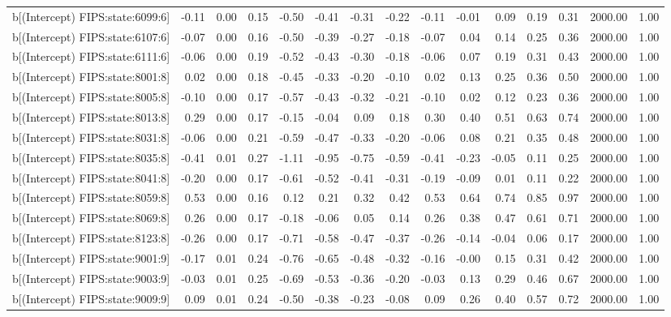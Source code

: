 \begin{table}[ht]
\begin{tabular}{rrrrrrrrrrrrrrr}
  b[(Intercept) FIPS:state:6099:6] & -0.11 & 0.00 & 0.15 & -0.50 & -0.41 & -0.31 & -0.22 & -0.11 & -0.01 & 0.09 & 0.19 & 0.31 & 2000.00 & 1.00 \\ 
  b[(Intercept) FIPS:state:6107:6] & -0.07 & 0.00 & 0.16 & -0.50 & -0.39 & -0.27 & -0.18 & -0.07 & 0.04 & 0.14 & 0.25 & 0.36 & 2000.00 & 1.00 \\ 
  b[(Intercept) FIPS:state:6111:6] & -0.06 & 0.00 & 0.19 & -0.52 & -0.43 & -0.30 & -0.18 & -0.06 & 0.07 & 0.19 & 0.31 & 0.43 & 2000.00 & 1.00 \\ 
  b[(Intercept) FIPS:state:8001:8] & 0.02 & 0.00 & 0.18 & -0.45 & -0.33 & -0.20 & -0.10 & 0.02 & 0.13 & 0.25 & 0.36 & 0.50 & 2000.00 & 1.00 \\ 
  b[(Intercept) FIPS:state:8005:8] & -0.10 & 0.00 & 0.17 & -0.57 & -0.43 & -0.32 & -0.21 & -0.10 & 0.02 & 0.12 & 0.23 & 0.36 & 2000.00 & 1.00 \\ 
  b[(Intercept) FIPS:state:8013:8] & 0.29 & 0.00 & 0.17 & -0.15 & -0.04 & 0.09 & 0.18 & 0.30 & 0.40 & 0.51 & 0.63 & 0.74 & 2000.00 & 1.00 \\ 
  b[(Intercept) FIPS:state:8031:8] & -0.06 & 0.00 & 0.21 & -0.59 & -0.47 & -0.33 & -0.20 & -0.06 & 0.08 & 0.21 & 0.35 & 0.48 & 2000.00 & 1.00 \\ 
  b[(Intercept) FIPS:state:8035:8] & -0.41 & 0.01 & 0.27 & -1.11 & -0.95 & -0.75 & -0.59 & -0.41 & -0.23 & -0.05 & 0.11 & 0.25 & 2000.00 & 1.00 \\ 
  b[(Intercept) FIPS:state:8041:8] & -0.20 & 0.00 & 0.17 & -0.61 & -0.52 & -0.41 & -0.31 & -0.19 & -0.09 & 0.01 & 0.11 & 0.22 & 2000.00 & 1.00 \\ 
  b[(Intercept) FIPS:state:8059:8] & 0.53 & 0.00 & 0.16 & 0.12 & 0.21 & 0.32 & 0.42 & 0.53 & 0.64 & 0.74 & 0.85 & 0.97 & 2000.00 & 1.00 \\ 
  b[(Intercept) FIPS:state:8069:8] & 0.26 & 0.00 & 0.17 & -0.18 & -0.06 & 0.05 & 0.14 & 0.26 & 0.38 & 0.47 & 0.61 & 0.71 & 2000.00 & 1.00 \\ 
  b[(Intercept) FIPS:state:8123:8] & -0.26 & 0.00 & 0.17 & -0.71 & -0.58 & -0.47 & -0.37 & -0.26 & -0.14 & -0.04 & 0.06 & 0.17 & 2000.00 & 1.00 \\ 
  b[(Intercept) FIPS:state:9001:9] & -0.17 & 0.01 & 0.24 & -0.76 & -0.65 & -0.48 & -0.32 & -0.16 & -0.00 & 0.15 & 0.31 & 0.42 & 2000.00 & 1.00 \\ 
  b[(Intercept) FIPS:state:9003:9] & -0.03 & 0.01 & 0.25 & -0.69 & -0.53 & -0.36 & -0.20 & -0.03 & 0.13 & 0.29 & 0.46 & 0.67 & 2000.00 & 1.00 \\ 
  b[(Intercept) FIPS:state:9009:9] & 0.09 & 0.01 & 0.24 & -0.50 & -0.38 & -0.23 & -0.08 & 0.09 & 0.26 & 0.40 & 0.57 & 0.72 & 2000.00 & 1.00 \\ 

\end{tabular}
\end{table}
